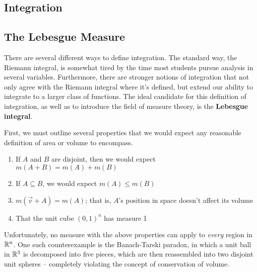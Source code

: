 \begin{comment}
so $\nabla f(5, 3)$ is the normal to the level curve at $P(5, 3)$

Example: find the normal vector to $-x^{2} + y^{2} - z^{2} = 4$ @ $P(1, 3, 2)$

$f(x, y, z) = -x^{2} + y^{2} - z^{2}$. $f(x, y, z)= 4$ is the level surface that contains $(1, 3, 2)$

$\nabla f(1, 3, 2)$ = the specific normal to $-x^{2} + y^{2} - z^{2} = 4$ @ $P(1, 3, 2)$.

General method: given $f(x, y, ...) = c$, let $f(x, y, ...)$ be a function and $f(x, y, ...) = c$ be the level curve at $c$. Find $\nabla f$ and plug in the values of the given point $P$.
\end{comment}


\pagebreak
{}
\begin{center}
\section{Integration}
\end{center}

\subsection{The Lebesgue Measure}

There are several different ways to define integration. The standard way, the Riemann integral, is somewhat tired by the time most students pursue analysis in several variables. Furthermore, there are stronger notions of integration that not only agree with the Riemann integral where it's defined, but extend our ability to integrate to a larger class of functions. The ideal candidate for this definition of integration, as well as to introduce the field of measure theory, is the \textbf{Lebesgue integral}.

First, we must outline several properties that we would expect any reasonable definition of area or volume to encompass. \begin{enumerate}
    \item If $A$ and $B$ are disjoint, then we would expect $m(A + B) = m(A) + m(B)$
    \item If $A \subseteq B$, we would expect $m(A) \leq m(B)$
    \item $m(\vec{v} + A) = m(A)$; that is, $A$'s position in space doesn't affect its volume
    \item That the unit cube $(0,1)^n$ has measure 1
\end{enumerate} Unfortunately, no measure with the above properties can apply to \textit{every} region in $\mathbb{R}^n$. One such counterexample is the Banach-Tarski paradox, in which a unit ball in $\mathbb{R}^3$ is decomposed into five pieces, which are then reassembled into two disjoint unit spheres -- completely violating the concept of conservation of volume.

